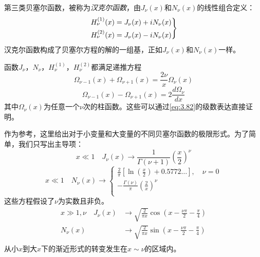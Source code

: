 \documentclass[12pt]{book}
\numberwithin{equation}{chapter}
\numberwithin{figure}{chapter}
\numberwithin{footnote}{page}
\begin{document}
第三类贝塞尔函数，被称为\textit{汉克尔函数}，由$J_\nu(x)$和$N_\nu(x)$的线性组合定义：
\begin{equation}\label{eq:3.86}
    \begin{rcases*}
        H_\nu^{(1)}(x)=J_\nu(x)+iN_\nu(x)\\
        H_\nu^{(2)}(x)=J_\nu(x)-iN_\nu(x)\\
    \end{rcases*}
\end{equation}
汉克尔函数构成了贝塞尔方程的解的一组基，正如$J_\nu(x)$和$N_\nu(x)$一样。

函数$J_\nu$，$N_\nu$，$H_\nu^{(1)}$，$H_\nu^{(2)}$都满足递推方程
\begin{equation}\label{eq:3.87}
    \Omega_{\nu-1}(x)+\Omega_{\nu+1}(x)=\frac{2\nu}{x}\Omega_\nu(x)
\end{equation}
\begin{equation}\label{eq:3.88}
    \Omega_{\nu-1}(x)-\Omega_{\nu+1}(x)=2\frac{d\Omega_\nu}{dx}
\end{equation}
其中$\Omega_\nu(x)$为任意一个$\nu$次的柱函数。这些可以通过\autoref{eq:3.82}的级数表达直接证明。

作为参考，这里给出对于小变量和大变量的不同贝塞尔函数的极限形式。为了简单，我们只写出主导项：
\begin{equation}\label{eq:3.89}
    x\ll1 \quad J_\nu(x)\to\frac{1}{\Gamma(\nu+1)}(\frac{x}{2})^\nu
\end{equation}
\begin{equation}\label{eq:3.90}
    x\ll1 \quad N_\nu(x)\to
    \begin{cases}
        \frac{2}{\pi}[\ln(\frac{x}{2})+0.5772\dots],\quad \nu=0\\
        -\frac{\Gamma(\nu)}{\pi}(\frac{2}{x})^\nu\\
    \end{cases}
\end{equation}
这些方程假设了$\nu$为实数且非负。
\begin{equation}\label{eq:3.91}
    \begin{aligned}
        x\gg1,\nu \quad J_\nu(x)&\to \sqrt{\frac{2}{\pi x}}\cos(x-\frac{\nu\pi}{2}-\frac{\pi}{4})\\
        N_\nu(x)&\to \sqrt{\frac{2}{\pi x}}\sin(x-\frac{\nu\pi}{2}-\frac{\pi}{4})\\
    \end{aligned}
\end{equation}
从小$x$到大$x$下的渐近形式的转变发生在$x\sim \nu$的区域内。
\end{document}
